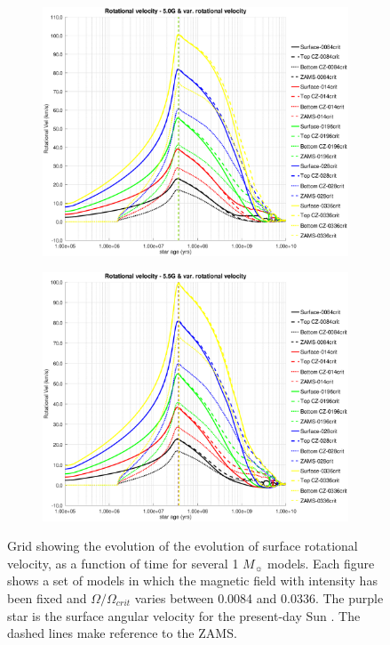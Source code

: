 \documentclass[fleqn,usenatbib]{mnras}
\begin{document}
\begin{figure}
\begin{subfigure}[h]{0.47\textwidth}
    \includegraphics[trim = 30mm 15mm 20mm 15mm, clip,width=\textwidth]{figures/rot_vel_var_vel_5_0g.eps}
    \label{fig:subim45}
    \end{subfigure}
    \begin{subfigure}[h]{0.47\textwidth}
    \includegraphics[trim = 30mm 15mm 20mm 15mm, clip,width=\textwidth]{figures/rot_vel_var_vel_5_5g.eps}
    \label{fig:subim46}
    \end{subfigure}
\caption{Grid showing the evolution of the evolution of surface rotational velocity, as a function of time for several 1 $M_{\sun}$ models. Each figure shows a set of models in which the magnetic field with intensity has been fixed and $\Omega / \Omega_{crit}$ varies between 0.0084 and 0.0336. The purple star is the surface angular velocity for the present-day Sun \citep{Gill2012}. The dashed lines make reference to the ZAMS.}
\label{fig:grid_rot_vel}
\end{figure}
\end{document}

